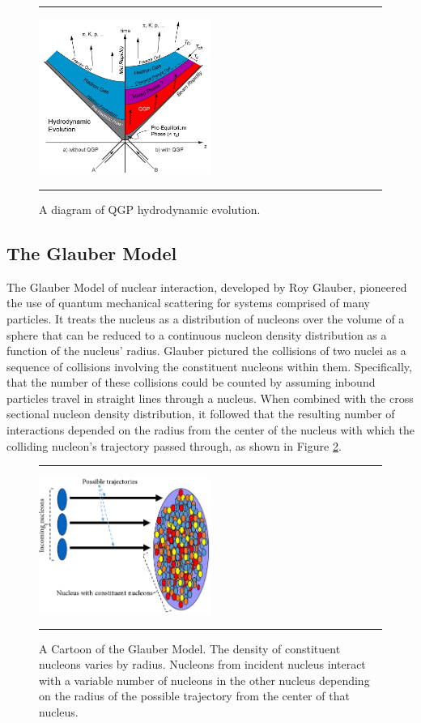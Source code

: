 \begin{figure}[b!]
  \centering
    \rule{35em}{0.5pt}
    \includegraphics[width=0.5\textwidth]{Figures/hydrodynamicevolution.JPG}

  \caption[A diagram of QGP hydrodynamic evolution.]{A diagram of QGP hydrodynamic evolution.}
  \label{fig:hydroevolution}
    \rule{35em}{0.5pt}
\end{figure}

\subsection{The Glauber Model}
\label{sect:glauber}
The Glauber Model of nuclear interaction, developed by Roy Glauber, pioneered the use of quantum mechanical scattering for systems comprised of many particles. It treats the nucleus as a distribution of nucleons over the volume of a sphere that can be reduced to a continuous nucleon density distribution as a function of the nucleus' radius\citep{Miller:2007ri}. Glauber pictured the collisions of two nuclei as a sequence of collisions involving the constituent nucleons within them. Specifically, that the number of these collisions could be counted by assuming inbound particles travel in straight lines through a nucleus. When combined with the cross sectional nucleon density distribution, it followed that the resulting number of interactions depended on the radius from the center of the nucleus with which the colliding nucleon's trajectory passed through, as shown in Figure \ref{fig:glaubermodel}.
\begin{figure}[b!]
  \centering
    \rule{35em}{0.5pt}
    \includegraphics[width=0.5\textwidth]{Figures/glauberpic.jpg}

  \caption[A cartoon of the Glauber Model]{A Cartoon of the Glauber Model. The density of constituent nucleons varies by radius. Nucleons from incident nucleus interact with a variable number of nucleons in the other nucleus depending on the radius of the possible trajectory from the center of that nucleus. \citep{Nagle:2006}}
  \label{fig:glaubermodel}
    \rule{35em}{0.5pt}
\end{figure}

